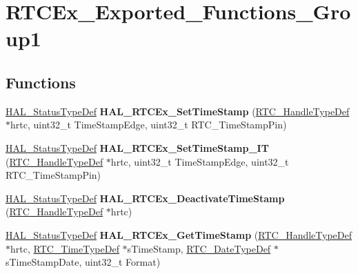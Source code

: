 \hypertarget{group___r_t_c_ex___exported___functions___group1}{}\section{R\+T\+C\+Ex\+\_\+\+Exported\+\_\+\+Functions\+\_\+\+Group1}
\label{group___r_t_c_ex___exported___functions___group1}
\subsection*{Functions}
\begin{DoxyCompactItemize}
\item 
\hyperlink{stm32f4xx__hal__def_8h_a63c0679d1cb8b8c684fbb0632743478f}{H\+A\+L\+\_\+\+Status\+Type\+Def} {\bfseries H\+A\+L\+\_\+\+R\+T\+C\+Ex\+\_\+\+Set\+Time\+Stamp} (\hyperlink{struct_r_t_c___handle_type_def}{R\+T\+C\+\_\+\+Handle\+Type\+Def} $\ast$hrtc, uint32\+\_\+t Time\+Stamp\+Edge, uint32\+\_\+t R\+T\+C\+\_\+\+Time\+Stamp\+Pin)\hypertarget{group___r_t_c_ex___exported___functions___group1_ga750db6ed8e6afde87530736826554019}{}\label{group___r_t_c_ex___exported___functions___group1_ga750db6ed8e6afde87530736826554019}

\item 
\hyperlink{stm32f4xx__hal__def_8h_a63c0679d1cb8b8c684fbb0632743478f}{H\+A\+L\+\_\+\+Status\+Type\+Def} {\bfseries H\+A\+L\+\_\+\+R\+T\+C\+Ex\+\_\+\+Set\+Time\+Stamp\+\_\+\+IT} (\hyperlink{struct_r_t_c___handle_type_def}{R\+T\+C\+\_\+\+Handle\+Type\+Def} $\ast$hrtc, uint32\+\_\+t Time\+Stamp\+Edge, uint32\+\_\+t R\+T\+C\+\_\+\+Time\+Stamp\+Pin)\hypertarget{group___r_t_c_ex___exported___functions___group1_ga96faf756e9e07d06ff1d7b696c21a6a4}{}\label{group___r_t_c_ex___exported___functions___group1_ga96faf756e9e07d06ff1d7b696c21a6a4}

\item 
\hyperlink{stm32f4xx__hal__def_8h_a63c0679d1cb8b8c684fbb0632743478f}{H\+A\+L\+\_\+\+Status\+Type\+Def} {\bfseries H\+A\+L\+\_\+\+R\+T\+C\+Ex\+\_\+\+Deactivate\+Time\+Stamp} (\hyperlink{struct_r_t_c___handle_type_def}{R\+T\+C\+\_\+\+Handle\+Type\+Def} $\ast$hrtc)\hypertarget{group___r_t_c_ex___exported___functions___group1_ga1d7152fccc39480de86c555c94e222a0}{}\label{group___r_t_c_ex___exported___functions___group1_ga1d7152fccc39480de86c555c94e222a0}

\item 
\hyperlink{stm32f4xx__hal__def_8h_a63c0679d1cb8b8c684fbb0632743478f}{H\+A\+L\+\_\+\+Status\+Type\+Def} {\bfseries H\+A\+L\+\_\+\+R\+T\+C\+Ex\+\_\+\+Get\+Time\+Stamp} (\hyperlink{struct_r_t_c___handle_type_def}{R\+T\+C\+\_\+\+Handle\+Type\+Def} $\ast$hrtc, \hyperlink{struct_r_t_c___time_type_def}{R\+T\+C\+\_\+\+Time\+Type\+Def} $\ast$s\+Time\+Stamp, \hyperlink{struct_r_t_c___date_type_def}{R\+T\+C\+\_\+\+Date\+Type\+Def} $\ast$s\+Time\+Stamp\+Date, uint32\+\_\+t Format)\hypertarget{group___r_t_c_ex___exported___functions___group1_ga68d83277bafa5fcebd10f1bd83ef059e}{}\label{group___r_t_c_ex___exported___functions___group1_ga68d83277bafa5fcebd10f1bd83ef059e}


\end{DoxyCompactItemize}
